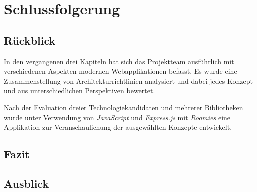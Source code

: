 \chapter{Schlussfolgerung}

\section*{Rückblick}
In den vergangenen drei Kapiteln hat sich das Projektteam ausführlich mit verschiedenen Aspekten modernen Webapplikationen befasst. Es wurde eine Zusammenstellung von Architekturrichtlinien analysiert und dabei jedes Konzept und aus unterschiedlichen Perspektiven bewertet.

Nach der Evaluation dreier Technologiekandidaten und mehrerer Bibliotheken wurde unter Verwendung von \emph{JavaScript} und \emph{Express.js} mit \emph{Roomies} eine Applikation zur Veranschaulichung der ausgewählten Konzepte entwickelt.


\section*{Fazit}



\section*{Ausblick}

